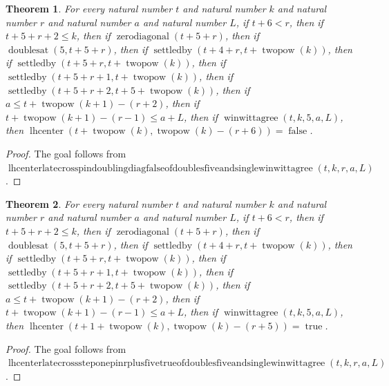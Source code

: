 \documentclass[11pt]{article}
\newtheorem{theorem}{Theorem}[section]
\theoremstyle{definition}
\begin{document}
\begin{theorem}
\label{ll:paper:lhcenter-late-cross-pin-doubling-diag-false-of-doubles-five-and-single-winwittagree}
For every natural number \(t\) and natural number \(k\) and natural number \(r\) and natural number \(a\) and natural number \(L\), if \(t + 6 < r\), then if \(t + 5 + r + 2 \le k\), then if \(\operatorname{zerodiagonal}(t + 5 + r)\), then if \(\operatorname{doublesat}(5, t + 5 + r)\), then if \(\operatorname{settledby}(t + 4 + r, t + \operatorname{twopow}(k))\), then if \(\operatorname{settledby}(t + 5 + r, t + \operatorname{twopow}(k))\), then if \(\operatorname{settledby}(t + 5 + r + 1, t + \operatorname{twopow}(k))\), then if \(\operatorname{settledby}(t + 5 + r + 2, t + 5 + \operatorname{twopow}(k))\), then if \(a \le t + \operatorname{twopow}(k + 1) - (r + 2)\), then if \(t + \operatorname{twopow}(k + 1) - (r - 1) \le a + L\), then if \(\operatorname{winwittagree}(t, k, 5, a, L)\), then \(\operatorname{lhcenter}(t + \operatorname{twopow}(k), \operatorname{twopow}(k) - (r + 6)) = \operatorname{false}\).
\end{theorem}
\begin{proof}
The goal follows from \(\operatorname{lhcenterlatecrosspindoublingdiagfalseofdoublesfiveandsinglewinwittagree}(t, k, r, a, L)\).
\end{proof}
\begin{theorem}
\label{ll:paper:lhcenter-late-cross-step-one-pin-r-plus-five-true-of-doubles-five-and-single-winwittagree}
For every natural number \(t\) and natural number \(k\) and natural number \(r\) and natural number \(a\) and natural number \(L\), if \(t + 6 < r\), then if \(t + 5 + r + 2 \le k\), then if \(\operatorname{zerodiagonal}(t + 5 + r)\), then if \(\operatorname{doublesat}(5, t + 5 + r)\), then if \(\operatorname{settledby}(t + 4 + r, t + \operatorname{twopow}(k))\), then if \(\operatorname{settledby}(t + 5 + r, t + \operatorname{twopow}(k))\), then if \(\operatorname{settledby}(t + 5 + r + 1, t + \operatorname{twopow}(k))\), then if \(\operatorname{settledby}(t + 5 + r + 2, t + 5 + \operatorname{twopow}(k))\), then if \(a \le t + \operatorname{twopow}(k + 1) - (r + 2)\), then if \(t + \operatorname{twopow}(k + 1) - (r - 1) \le a + L\), then if \(\operatorname{winwittagree}(t, k, 5, a, L)\), then \(\operatorname{lhcenter}(t + 1 + \operatorname{twopow}(k), \operatorname{twopow}(k) - (r + 5)) = \operatorname{true}\).
\end{theorem}
\begin{proof}
The goal follows from \(\operatorname{lhcenterlatecrosssteponepinrplusfivetrueofdoublesfiveandsinglewinwittagree}(t, k, r, a, L)\).
\end{proof}
\end{document}
